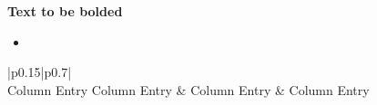 
\textbf{Text to be bolded}

\citep{Bibtex Key}


\begin{itemize}
      \item     
\end{itemize}


\begin{center}
\begin{table}[htbp]
\label{}
  \centering
  \caption{}
    \begin{tabular}{|p{}|p{}|}
    \hline
     \\
    \hline
    Column Entry
    \hline
    Column Entry &
   Column Entry &
   Column Entry
\end{tabular}
\end{table}
\end{center}